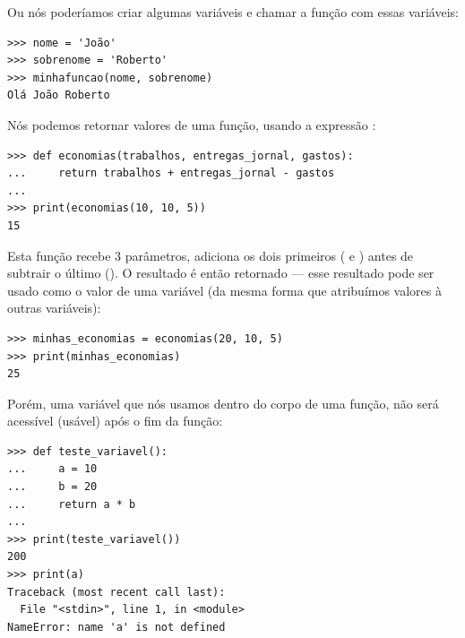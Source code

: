 \noindent
Ou nós poderíamos criar algumas variáveis e chamar a função com essas variáveis:

\begin{listing}
\begin{verbatim}
>>> nome = 'João'
>>> sobrenome = 'Roberto'
>>> minhafuncao(nome, sobrenome)
Olá João Roberto
\end{verbatim}
\end{listing}

\noindent
Nós podemos retornar valores de uma função, usando a expressão :

\begin{listing}
\begin{verbatim}
>>> def economias(trabalhos, entregas_jornal, gastos):
...     return trabalhos + entregas_jornal - gastos
...
>>> print(economias(10, 10, 5))
15
\end{verbatim}
\end{listing}

Esta função recebe 3 parâmetros, adiciona os dois primeiros ( e ) antes de subtrair o último (). O resultado é então retornado --- esse resultado pode ser usado como o valor de uma variável (da mesma forma que atribuímos valores à outras variáveis):

\begin{listing}
\begin{verbatim}
>>> minhas_economias = economias(20, 10, 5)
>>> print(minhas_economias)
25
\end{verbatim}
\end{listing}

\noindent
Porém, uma variável que nós usamos dentro do corpo de uma função, não será acessível (usável) após o fim da função:

\begin{listing}
\begin{verbatim}
>>> def teste_variavel():
...     a = 10
...     b = 20
...     return a * b
...
>>> print(teste_variavel())
200
>>> print(a)
Traceback (most recent call last):
  File "<stdin>", line 1, in <module>
NameError: name 'a' is not defined
\end{verbatim}
\end{listing} 

